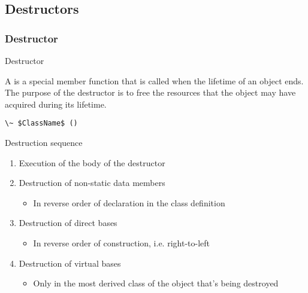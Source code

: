 \subsection{Destructors}

\subsubsection{Destructor}

\begin{frame}{Destructor}{}
  \begin{definition}[Destructor]
    A  is a special member function that is called when the lifetime of an object ends. The purpose of the destructor is to free the resources that the object may have acquired during its lifetime.

    {
      \hfill\lstinline[mathescape]!\~ $ClassName$ ()!\hfill
    }
  \end{definition}

  \begin{block}{Destruction sequence}
    \begin{enumerate}
    \item
      Execution of the body of the destructor
    \item
      Destruction of non-static data members
      \begin{itemize}
      \item
        In reverse order of declaration in the class definition
      \end{itemize}
    \item
      Destruction of direct bases
      \begin{itemize}
      \item
        In reverse order of construction, i.e. right-to-left
      \end{itemize}
    \item
      Destruction of virtual bases
      \begin{itemize}
      \item
        Only in the most derived class of the object that's being destroyed
      \end{itemize}
    \end{enumerate}
  \end{block}
\end{frame}

